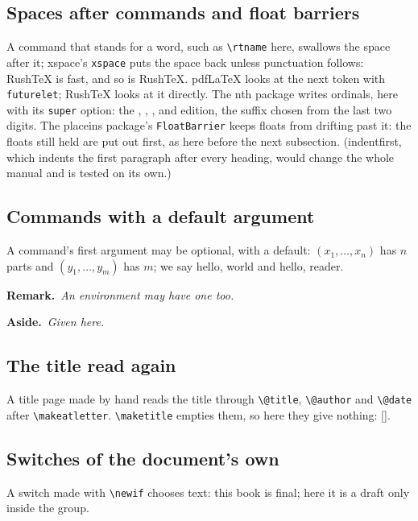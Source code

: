 \documentclass{article}
\makeatletter
\newcommand{\rtname}{RushTeX\xspace}
\numberwithin{equation}{section}
\theoremstyle{definition}
\theoremstyle{remark}
\newcommand{\rtvec}[2][n]{(#2_1,\dots,#2_{#1})}
\newcommand*{\rtgreet}[1][world]{hello, #1}
\newenvironment{rtremark}[1][Remark]{\par\noindent\textbf{#1.}\ \itshape}{\par}
\newif\ifrtdraft
\newcommand{\rttitleagain}{[\@title\@date]}
\makeatother
\begin{document}
\subsection{Spaces after commands and float barriers}\label{sec:xspace}
A command that stands for a word, such as \verb|\rtname| here, swallows the space after
it; xspace's \texttt{xspace} puts the space back unless punctuation follows: \rtname is
fast, and so is \rtname. pdfLaTeX looks at the next token with \texttt{futurelet};
RushTeX looks at it directly. The nth package writes ordinals, here with its
\texttt{super} option: the , , ,  and  edition, the suffix
chosen from the last two digits. The placeins package's \texttt{FloatBarrier} keeps floats
from drifting past it: the floats still held are put out first, as here before the next
subsection. (indentfirst, which indents the first paragraph after every heading, would
change the whole manual and is tested on its own.)
\FloatBarrier

\subsection{Commands with a default argument}\label{sec:defaultarg}
A command's first argument may be optional, with a default: $\rtvec{x}$ has $n$ parts and
$\rtvec[m]{y}$ has $m$; we say \rtgreet{} and \rtgreet[reader].
\begin{rtremark}An environment may have one too.\end{rtremark}
\begin{rtremark}[Aside]Given here.\end{rtremark}

\subsection{The title read again}\label{sec:titlemacros}
A title page made by hand reads the title through \verb|\@title|, \verb|\@author| and
\verb|\@date| after \verb|\makeatletter|. \verb|\maketitle| empties them, so here they
give nothing: \rttitleagain.

\subsection{Switches of the document's own}\label{sec:newif}
A switch made with \verb|\newif| chooses text: this book is \ifrtdraft a draft\else
final\fi; {\rtdrafttrue here it is \ifrtdraft a draft\else final\fi} only inside the group.
\end{document}
